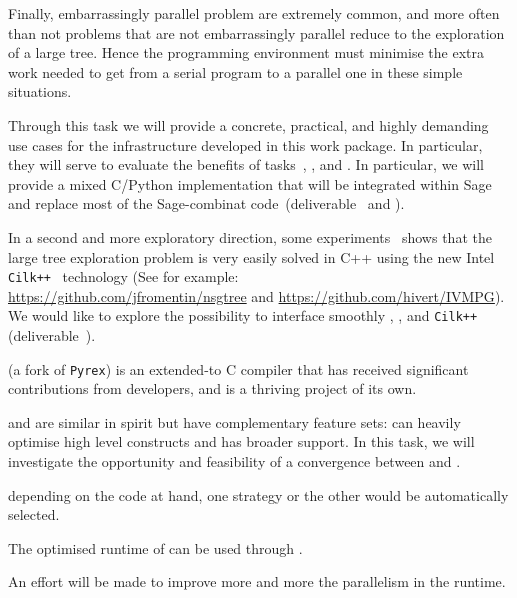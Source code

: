 \begin{workpackage}
\begin{tasklist}
\begin{task}[title=HPC infrastructure for combinatorics,id=hpc-combi,PM=26,lead=PS,partners={UB},wphases={0-6!0.3,12-36!0.5},issue=104]
  Finally, embarrassingly parallel problem are extremely common, and
  more often than not problems that are not embarrassingly parallel
  reduce to the exploration of a large tree. Hence the programming
  environment must minimise the extra work needed to get from a serial
  program to a parallel one in these simple situations.

  Through this task we will provide a concrete, practical, and highly
  demanding use cases for the infrastructure developed in this work
  package. In particular, they will serve to evaluate the benefits of
  tasks~,
  , and
  .
  In particular, we will provide a mixed C/Python implementation that
  will be integrated within Sage and replace most of the Sage-combinat
  code~(deliverable~ 
  and ).

  In a second and more exploratory direction, some
  experiments~\cite{FromentinHivert} shows that the large tree exploration
  problem is very easily solved in C++ using the new Intel
  \texttt{Cilk++}~\cite{CilkIntel,CilkRefman} technology (See for example:\\
  \href{https://github.com/jfromentin/nsgtree}{https://github.com/jfromentin/nsgtree}
  and
  \href{https://github.com/hivert/IVMPG}{https://github.com/hivert/IVMPG}). We
  would like to explore the possibility to interface smoothly \Pythran,
  \Cython, and \texttt{Cilk++} (deliverable~).
\end{task}

\begin{task}[title=Pythran,id=pythran,lead=LL,partners={UJF,UO},PM=26, wphases=0-24, issue=105]
  \Cython (a fork of \texttt{Pyrex}) is an extended-\Python to C
  compiler that has received significant contributions from \Sage
  developers, and is a thriving project of its own.

  \Pythran and \Cython are similar in spirit but have complementary feature
  sets: \Pythran can heavily optimise high level \Numpy constructs and \Cython
  has broader \Python support. In this task, we will investigate the
  opportunity and feasibility of a convergence between \Cython and \Pythran.
  \begin{compactitem}
    \item depending on the code at hand, one strategy or the other would be automatically selected.
    \item The optimised runtime of \Pythran can be used through \Cython.
  \end{compactitem}
  An effort will be made to improve more and more the parallelism in the
  \Pythran runtime.


\end{task}
\end{tasklist}
\end{workpackage}

